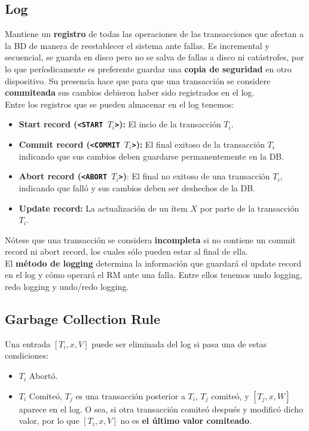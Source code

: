 \subsection*{Log}
Mantiene un \textbf{registro} de todas las operaciones de las transacciones que afectan a la BD de manera de reestablecer el sistema ante fallas. Es incremental y secuencial, se guarda en disco pero no se salva de fallas a disco ni catástrofes, por lo que períodicamente es preferente guardar una \textbf{copia de seguridad} en otro dispositivo. Su presencia hace que para que una transacción se considere \textbf{commiteada} sus cambios debieron haber sido registrados en el log. \\
Entre los registros que se pueden almacenar en el log tenemos:
\begin{itemize}
    \item \textbf{Start record (\texttt{<START $T_i$>}):} El incio de la transacción $T_i$.
    \item \textbf{Commit record (\texttt{<COMMIT $T_i$>}):} El final exitoso de la transacción $T_i$ indicando que sus cambios deben guardarse permanentemente en la DB.
    \item \textbf{Abort record (\texttt{<ABORT $T_i$>})}: El final no exitoso de una transacción $T_i$, indicando que falló y sus cambios deben ser deshechos de la DB.
    \item \textbf{Update record:} La actualización de un ítem $X$ por parte de la transacción $T_i$.
\end{itemize}
Nótese que una transacción se considera \textbf{incompleta} si no contiene un commit record ni abort record, los cuales sólo pueden estar al final de ella. \\
El \textbf{método de logging} determina la información que guardará el update record en el log y cómo operará el RM ante una falla. Entre ellos tenemos undo logging, redo logging y undo/redo logging.

\subsection*{Garbage Collection Rule}

Una entrada $[T_i, x, V]$ puede ser eliminada del log si pasa una de estas condiciones:

\begin{itemize}
        \item $T_i$ Abortó.
        \item $T_i$ Comiteó, $T_j$ es una transacción posterior a $T_i$, $T_j$ comiteó, y $[T_j, x, W]$ aparece en el log. O sea, si otra transacción comiteó después y modificó dicho valor, por lo que $[T_i, x, V]$ no  es \textbf{el último valor comiteado}.
    \end{itemize}

